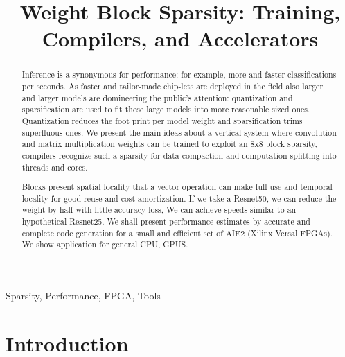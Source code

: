 \documentclass[conference]{IEEEtran}
\begin{document}
\title{Weight Block Sparsity: Training, Compilers, and Accelerators  }

\author{
  \and
  \and
}

\maketitle

\begin{abstract}
Inference is a synonymous for performance: for example, more and
faster classifications per seconds. As faster and tailor-made
chip-lets are deployed in the field also larger and larger models are
domineering the public's attention: quantization and sparsification
are used to fit these large models into more reasonable sized
ones. Quantization reduces the foot print per model weight and
sparsification trims superfluous ones.  We present the main ideas
about a vertical system where convolution and matrix multiplication
weights can be trained to exploit an 8x8 block sparsity, compilers
recognize such a sparsity for data compaction and computation
splitting into threads and cores.

Blocks present spatial locality that a vector operation can make full
use and temporal locality for good reuse and cost amortization. If we
take a Resnet50, we can reduce the weight by half with little accuracy
loss, We can achieve speeds similar to an hypothetical Resnet25. We
shall present performance estimates by accurate and complete code
generation for a small and efficient set of AIE2 (Xilinx Versal
FPGAs). We show application for general CPU, GPUS.

\end{abstract}


\begin{IEEEkeywords}
Sparsity, Performance, FPGA, Tools
\end{IEEEkeywords}

\section{Introduction}
\label{sec:introduction}
\end{document}
